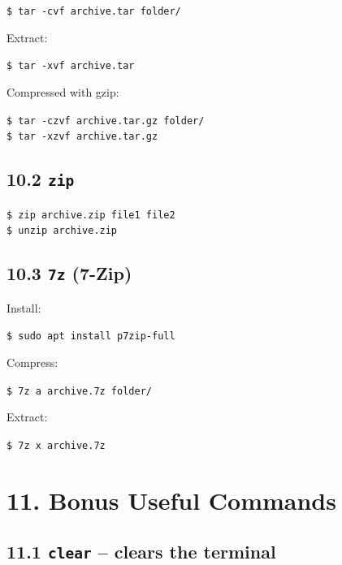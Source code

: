 \documentclass[12pt]{article}
\begin{document}
\begin{highlightbox}
\texttt{\$ tar -cvf archive.tar folder/}
\end{highlightbox}

Extract:

\begin{highlightbox}
\texttt{\$ tar -xvf archive.tar}
\end{highlightbox}

Compressed with gzip:

\begin{highlightbox}
\texttt{\$ tar -czvf archive.tar.gz folder/}\\
\texttt{\$ tar -xzvf archive.tar.gz}
\end{highlightbox}

\subsection*{10.2 \texttt{zip}}

\begin{highlightbox}
\texttt{\$ zip archive.zip file1 file2}\\
\texttt{\$ unzip archive.zip}
\end{highlightbox}

\subsection*{10.3 \texttt{7z} (7-Zip)}

Install:

\begin{highlightbox}
\texttt{\$ sudo apt install p7zip-full}
\end{highlightbox}

Compress:

\begin{highlightbox}
\texttt{\$ 7z a archive.7z folder/}
\end{highlightbox}

Extract:

\begin{highlightbox}
\texttt{\$ 7z x archive.7z}
\end{highlightbox}

\section*{11. Bonus Useful Commands}

\subsection*{11.1 \texttt{clear} – clears the terminal}
\end{document}
